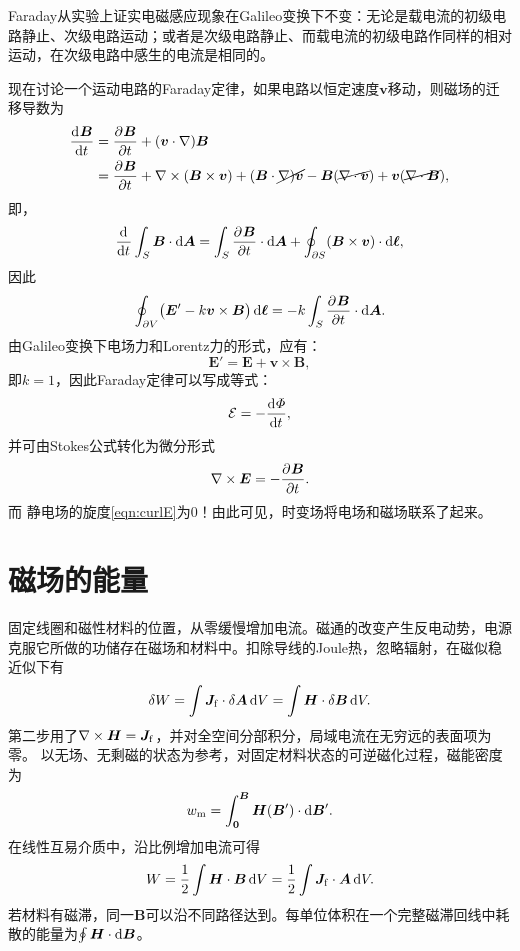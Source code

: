 Faraday从实验上证实电磁感应现象在Galileo变换下不变：无论是载电流的初级电路静止、次级电路运动；或者是次级电路静止、而载电流的初级电路作同样的相对运动，在次级电路中感生的电流是相同的。

现在讨论一个运动电路的Faraday定律，如果电路以恒定速度$\bm v$移动，则磁场的迁移导数为
\begin{align*}
    \frac{\mathop{}\!\mathrm{d}^{}\bm B}{\mathrm{d}{t}^{}} &= \frac{\partial^{}\bm B}{\partial{t}^{}} + (\bm v \cdot \nabla)\bm B\\
    &= \frac{\partial^{}\bm B}{\partial{t}^{}} + \nabla\times(\bm B \times \bm v) + (\bm B \cdot \cancel{\nabla)\bm v} - \bm B(\cancel{\nabla\cdot\bm v}) + \bm v(\cancel{\nabla\cdot\bm B}),
\end{align*}
即，
\begin{equation}
    \label{eq:ed-moving-surface-flux}
    \frac{\mathop{}\!\mathrm{d}^{}}{\mathrm{d}{t}^{}}\int_S\bm B \cdot \mathop{}\!\mathrm{d}\bm A = \int_S\frac{\partial^{}\bm B}{\partial{t}^{}} \cdot \mathop{}\!\mathrm{d}\bm A + \oint_{\partial S}(\bm B \times \bm v) \cdot \mathop{}\!\mathrm{d}\bm\ell,
\end{equation}
因此 
\[
    \oint_{\partial V}\bigl(\bm E' - k\bm v \times \bm B\bigr)\mathop{}\!\mathrm{d}\bm\ell = -k\int_S\frac{\partial^{}\bm B}{\partial{t}^{}} \cdot \mathop{}\!\mathrm{d}\bm A.
\]
由Galileo变换下电场力和Lorentz力的形式，应有：
\[
    \bm E' = \bm E + \bm v \times \bm B,
\]
即$k = 1$，因此Faraday定律可以写成等式：
\begin{equation}
    \label{eqn:Faraday}
    \mathcal E = -\frac{\mathop{}\!\mathrm{d}^{}\varPhi}{\mathrm{d}{t}^{}},
\end{equation}
并可由Stokes公式转化为微分形式
\begin{equation}
    \label{eqn:curlE-B}
    \nabla\times\bm E = -\frac{\partial^{}\bm B}{\partial{t}^{}}.
\end{equation}
而%
静电场的旋度\eqref{eqn:curlE}为0！由此可见，时变场将电场和磁场联系了起来。

\section{磁场的能量}
\label{sec:energy in the magnetic field}

固定线圈和磁性材料的位置，从零缓慢增加电流。磁通的改变产生反电动势，电源克服它所做的功储存在磁场和材料中。扣除导线的Joule热，忽略辐射，在磁似稳近似下有
\begin{equation}
    \label{eq:ed-magnetization-work}
    \delta W = \int\bm J_{\mathrm f} \cdot \delta\bm A\mathop{}\!\mathrm{d} V
       = \int\bm H \cdot \delta\bm B\mathop{}\!\mathrm{d} V .
\end{equation}
第二步用了$\nabla\times\bm H = \bm J_{\mathrm f}$，并对全空间分部积分，局域电流在无穷远的表面项为零。
以无场、无剩磁的状态为参考，对固定材料状态的可逆磁化过程，磁能密度为
\begin{equation}
    \label{eq:ed-reversible-magnetic-energy-density}
    w_\mathrm m = \int_{\bm 0}^{\bm B}\bm H(\bm B') \cdot \mathop{}\!\mathrm{d}\bm B'.
\end{equation}
在线性互易介质中，沿比例增加电流可得
\begin{equation}
    W = \frac12\int\bm H \cdot \bm B\mathop{}\!\mathrm{d} V
      = \frac12\int\bm J_{\mathrm f} \cdot \bm A\mathop{}\!\mathrm{d} V .
\end{equation}
若材料有磁滞，同一$\bm B$可以沿不同路径达到。每单位体积在一个完整磁滞回线中耗散的能量为$\textstyle \oint\bm H \cdot \mathop{}\!\mathrm{d}\bm B$。

